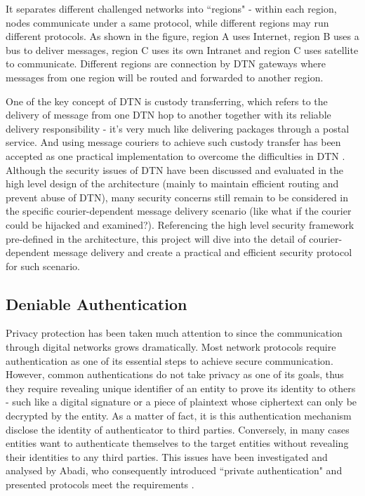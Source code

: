 It separates different challenged networks into ``regions" - within each region, nodes communicate under a same protocol, while different regions may run different protocols. As shown in the figure, region A uses Internet, region B uses a bus to deliver messages, region C uses its own Intranet and region C uses satellite to communicate. Different regions are connection by DTN gateways where messages from one region will be routed and forwarded to another region.

One of the key concept of DTN is custody transferring, which refers to the delivery of message from one DTN hop to another together with its reliable delivery responsibility - it's very much like delivering packages through a postal service. And using message couriers to achieve such custody transfer has been accepted as one practical implementation to overcome the difficulties in DTN \cite{Jain}\cite{Zhao}. Although the security issues of DTN have been discussed and evaluated in the high level design of the architecture \cite{Cerf}\cite{Scottrfc} (mainly to maintain efficient routing and prevent abuse of DTN), many security concerns still remain to be considered in the specific courier-dependent message delivery scenario (like what if the courier could be hijacked and examined?). Referencing the high level security framework pre-defined in the architecture, this project will dive into the detail of courier-dependent message delivery and create a practical and efficient security protocol for such scenario.

\subsection{Deniable Authentication}
Privacy protection has been taken much attention to since the communication through digital networks grows dramatically. Most network protocols require authentication as one of its essential steps to achieve secure communication. However, common authentications do not take privacy as one of its goals, thus they require revealing unique identifier of an entity to prove its identity to others - such like a digital signature or a piece of plaintext whose ciphertext can only be decrypted by the entity. As a matter of fact, it is this authentication mechanism disclose the identity of authenticator to third parties. Conversely, in many cases entities want to authenticate themselves to the target entities without revealing their identities to any third parties. This issues have been investigated and analysed by Abadi, who consequently introduced ``private authentication" and presented protocols meet the requirements \cite{Abadi}.

